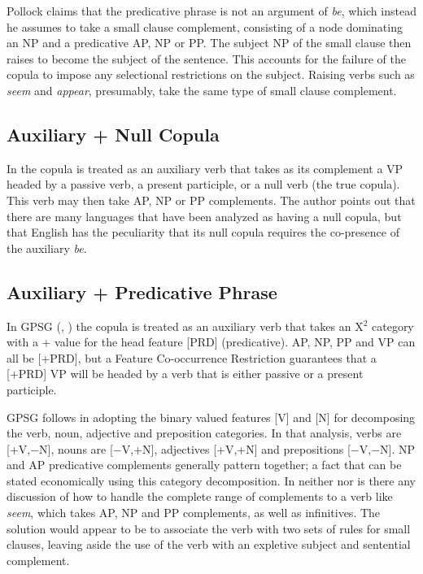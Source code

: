 {Pollock claims that the predicative phrase is not an argument of {\it be},
which instead he assumes to take a small clause complement, consisting of a
node dominating an NP and a predicative AP, NP or PP. The subject NP of the
small clause then raises to become the subject of the sentence.  This accounts
for the failure of the copula to impose any selectional restrictions on the
subject.  Raising verbs such as {\it seem} and {\it appear}, presumably, take the
same type of small clause complement.

\subsection{Auxiliary + Null Copula}
\label{la}

In \cite{lapointe80} the copula is treated as an auxiliary verb that takes as its
complement a VP headed by a passive verb, a present participle, or a null verb
(the true copula). This verb may then take AP, NP or PP complements.  The
author points out that there are many languages that have been analyzed as
having a null copula, but that English has the peculiarity that its
null copula requires the co-presence of the auxiliary {\it be}.

\subsection{Auxiliary + Predicative Phrase}
\label{gpsg}

In GPSG (\cite{gazdar85}, \cite{sag85}) the copula is treated as an auxiliary
verb that takes an X$^{2}$ category with a + value for the head feature
[PRD] (predicative). AP, NP, PP and VP can all be [+PRD], but a
Feature Co-occurrence Restriction guarantees that a [+PRD] VP will be
headed by a verb that is either passive or a present participle.

GPSG follows \cite{chomsky70} in adopting the binary valued features [V] and
[N] for decomposing the verb, noun, adjective and preposition categories.  In
that analysis, verbs are [+V,$-$N], nouns are [$-$V,+N], adjectives [+V,+N] and
prepositions [$-$V,$-$N].  NP and AP predicative complements generally pattern
together; a fact that can be stated economically using this category
decomposition.  In neither \cite{sag85} nor \cite{chomsky70} is there any
discussion of how to handle the complete range of complements to a verb like
{\it seem}, which takes AP, NP and PP complements, as well as infinitives.  The
solution would appear to be to associate the verb with two sets of rules for
small clauses, leaving aside the use of the verb with an expletive subject and
sentential complement.

}
